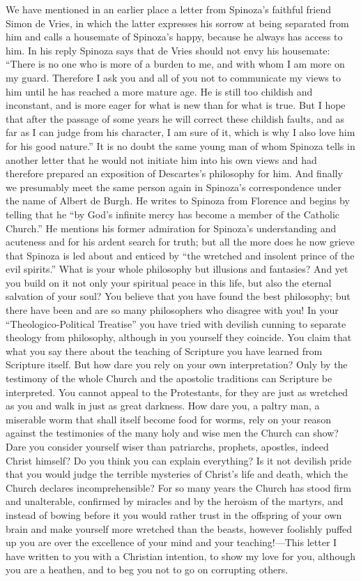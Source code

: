 \documentclass[12pt]{book}
\newcommand{\opage}[1]{\marginnote{\footnotesize\textit{[#1]}}}
\begin{document}
We have mentioned in an earlier place a letter from Spinoza's faithful friend Simon
de Vries, in which the latter expresses his sorrow at being separated from him and
calls a housemate of Spinoza's happy, because he always has access to him. In his
reply Spinoza says that de Vries \opage{60}should not envy his housemate: ``There is no
one who is more of a burden to me, and with whom I am more on my guard. Therefore I ask
you and all of you not to communicate my views to him until he has reached a more
mature age. He is still too childish and inconstant, and is more eager for what is new
than for what is true. But I hope that after the passage of some years he will correct
these childish faults, and as far as I can judge from his character, I am sure of it,
which is why I also love him for his good nature.'' It is no doubt the same young man
of whom Spinoza tells in another letter that he would not initiate him into his own
views and had therefore prepared an exposition of Descartes's philosophy for him. And
finally we presumably meet the same person again in Spinoza's correspondence under the
name of Albert de Burgh. He writes to Spinoza from Florence and begins by telling that
he ``by God's infinite mercy has become a member of the Catholic Church.'' He mentions
his former admiration for Spinoza's understanding and acuteness and for his ardent
search for truth; but all the more does he now grieve that Spinoza is led about and
enticed by ``the wretched and insolent prince of the evil spirits.'' What is your whole
philosophy but illusions and fantasies? And yet you build on it not only your spiritual
peace in this life, but also the eternal salvation of your soul? You believe that you
have found the best philosophy; but there have been and are so many philosophers who
disagree with you! In your ``Theologico-Political Treatise'' you have tried with
devilish cunning to separate \opage{61}theology from philosophy, although in you
yourself they coincide. You claim that what you say there about the teaching of
Scripture you have learned from Scripture itself. But how dare you rely on your own
interpretation? Only by the testimony of the whole Church and the apostolic traditions
can Scripture be interpreted. You cannot appeal to the Protestants, for they are just
as wretched as you and walk in just as great darkness. How dare you, a paltry man, a
miserable worm that shall itself become food for worms, rely on your reason against the
testimonies of the many holy and wise men the Church can show? Dare you consider
yourself wiser than patriarchs, prophets, apostles, indeed Christ himself? Do you think
you can explain everything? Is it not devilish pride that you would judge the terrible
mysteries of Christ's life and death, which the Church declares incomprehensible? For
so many years the Church has stood firm and unalterable, confirmed by miracles and by
the heroism of the martyrs, and instead of bowing before it you would rather trust in
the offspring of your own brain and make yourself more wretched than the beasts, however
foolishly puffed up you are over the excellence of your mind and your teaching!---This
letter I have written to you with a Christian intention, to show my love for you,
although you are a heathen, and to beg you not to go on corrupting others.
\end{document}
